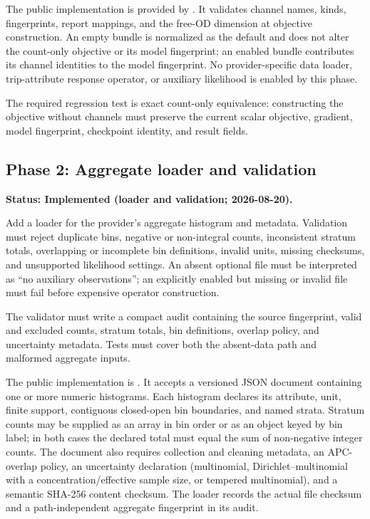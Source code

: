 The public implementation is provided by
.  It validates
channel names, kinds, fingerprints, report mappings, and the free-OD dimension
at objective construction.  An empty bundle is normalized as the default and
does not alter the count-only objective or its model fingerprint; an enabled
bundle contributes its channel identities to the model fingerprint.  No
provider-specific data loader, trip-attribute response operator, or auxiliary
likelihood is enabled by this phase.

The required regression test is exact count-only equivalence: constructing the
objective without channels must preserve the current scalar objective,
gradient, model fingerprint, checkpoint identity, and result fields.

\subsection{Phase 2: Aggregate loader and validation}
\label{sec:gps-implementation-phase-2}
\textbf{Status: Implemented (loader and validation; 2026-08-20).}

Add a loader for the provider's aggregate histogram and metadata.  Validation
must reject duplicate bins, negative or non-integral counts, inconsistent
stratum totals, overlapping or incomplete bin definitions, invalid units,
missing checksums, and unsupported likelihood settings.  An absent optional
file must be interpreted as ``no auxiliary observations''; an explicitly
enabled but missing or invalid file must fail before expensive operator
construction.

The validator must write a compact audit containing the source fingerprint,
valid and excluded counts, stratum totals, bin definitions, overlap policy, and
uncertainty metadata.  Tests must cover both the absent-data path and malformed
aggregate inputs.

The public implementation is
.  It accepts a
versioned JSON document containing one or more numeric histograms.  Each
histogram declares its attribute, unit, finite support, contiguous closed-open
bin boundaries, and named strata.  Stratum counts may be supplied as an array
in bin order or as an object keyed by bin label; in both cases the declared
total must equal the sum of non-negative integer counts.  The document also
requires collection and cleaning metadata, an APC-overlap policy, an
uncertainty declaration (multinomial, Dirichlet--multinomial with a
concentration/effective sample size, or tempered multinomial), and a semantic
SHA-256 content checksum.  The loader records the actual file checksum and a
path-independent aggregate fingerprint in its audit.

